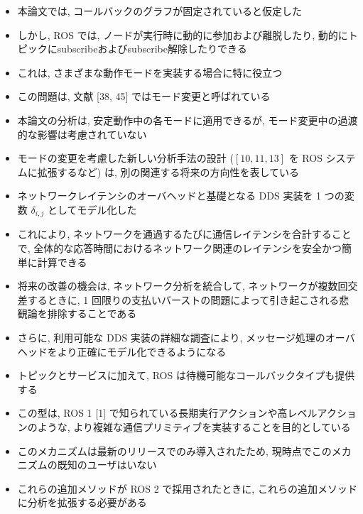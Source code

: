 \begin{frame}{}
    \begin{itemize}
        \item 本論文では, コールバックのグラフが固定されていると仮定した
\item しかし, ROS では, ノードが実行時に動的に参加および離脱したり, 動的にトピックにsubscribeおよびsubscribe解除したりできる
\item これは, さまざまな動作モードを実装する場合に特に役立つ
\item この問題は, 文献 [38, 45] ではモード変更と呼ばれている
\item 本論文の分析は, 安定動作中の各モードに適用できるが, モード変更中の過渡的な影響は考慮されていない
\item モードの変更を考慮した新しい分析手法の設計 ($[10,11,13]$ を ROS システムに拡張するなど) は, 別の関連する将来の方向性を表している
    \end{itemize}
\end{frame}

\begin{frame}{}
    \begin{itemize}
        \item ネットワークレイテンシのオーバヘッドと基礎となる DDS 実装を 1 つの変数 $\delta_{i, j}$ としてモデル化した
\item これにより, ネットワークを通過するたびに通信レイテンシを合計することで, 全体的な応答時間におけるネットワーク関連のレイテンシを安全かつ簡単に計算できる
\item 将来の改善の機会は, ネットワーク分析を統合して, ネットワークが複数回交差するときに, 1 回限りの支払いバーストの問題によって引き起こされる悲観論を排除することである
\item さらに, 利用可能な DDS 実装の詳細な調査により, メッセージ処理のオーバヘッドをより正確にモデル化できるようになる
    \end{itemize}
\end{frame}

\begin{frame}{}
    \begin{itemize}
        \item トピックとサービスに加えて, ROS は待機可能なコールバックタイプも提供する
\item この型は, ROS 1 [1] で知られている長期実行アクションや高レベルアクションのような, より複雑な通信プリミティブを実装することを目的としている
\item このメカニズムは最新のリリースでのみ導入されたため, 現時点でこのメカニズムの既知のユーザはいない
\item これらの追加メソッドが ROS 2 で採用されたときに, これらの追加メソッドに分析を拡張する必要がある
    \end{itemize}
\end{frame}

